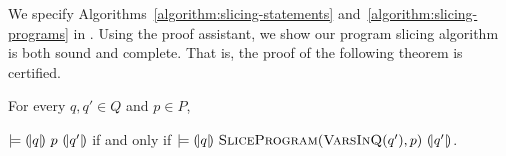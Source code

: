 We specify Algorithms~\ref{algorithm:slicing-statements}
and~\ref{algorithm:slicing-programs} in \coq. Using the proof
assistant, we show our program slicing algorithm is both sound and
complete. That is, the proof of the following theorem is certified.

\begin{theorem}
  For every $q, q' \in Q$ and $p \in P$,
  \begin{center}
  $\models {(\!|}{q}{|\!)}~{p}~{(\!|}{q'}{|\!)}$ if and only if
  $\models {(\!|}{q}{|\!)}~{\textsc{SliceProgram}(\textsc{VarsInQ}(q'), p)}~{(\!|}{q'}{|\!)}$.
  \end{center}

\end{theorem}